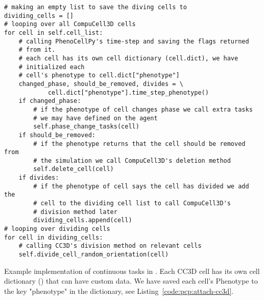 \begin{listing}[!htbp]
\begin{verbatim}
# making an empty list to save the diving cells to 
dividing_cells = []
# looping over all CompuCell3D cells
for cell in self.cell_list:
    # calling PhenoCellPy's time-step and saving the flags returned 
    # from it.
    # each cell has its own cell dictionary (cell.dict), we have 
    # initialized each
    # cell's phenotype to cell.dict["phenotype"] 
    changed_phase, should_be_removed, divides = \
            cell.dict["phenotype"].time_step_phenotype()
    if changed_phase:
        # if the phenotype of cell changes phase we call extra tasks 
        # we may have defined on the agent
        self.phase_change_tasks(cell)
    if should_be_removed:
        # if the phenotype returns that the cell should be removed from 
        # the simulation we call CompuCell3D's deletion method
        self.delete_cell(cell)
    if divides:
        # if the phenotype of cell says the cell has divided we add the 
        # cell to the dividing cell list to call CompuCell3D's 
        # division method later
        dividing_cells.append(cell)
# looping over dividing cells
for cell in dividing_cells:
    # calling CC3D's division method on relevant cells
    self.divide_cell_random_orientation(cell)
\end{verbatim}
\caption{Example implementation of continuous \pcps tasks in \ccd. Each CC3D cell has its own cell dictionary () that can have custom data. We have saved each cell's Phenotype to the key "phenotype" in the dictionary, see Listing~\ref{code:pcp:attach-cc3d}.}\label{code:pcp:step}
\end{listing}




